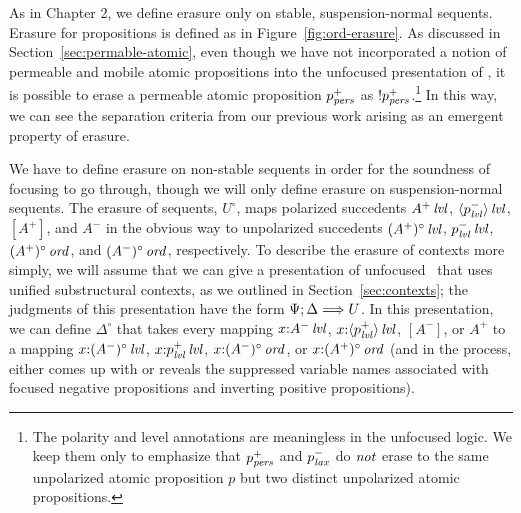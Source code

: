 As in Chapter 2, we define erasure only on stable, suspension-normal
sequents. Erasure for propositions is defined as in
Figure~\ref{fig:ord-erasure}. As discussed in
Section~\ref{sec:permable-atomic}, even though we have not
incorporated a notion of permeable and mobile atomic propositions into
the unfocused presentation of \ollll, it is possible to erase a
permeable atomic proposition $p^+_{\it pers}$ as
${!}p^+_{\it pers}$.\footnote{The polarity and level annotations are
  meaningless in the unfocused logic. We keep them only to emphasize
  that $p^+_{\it pers}$ and $p^-_{\it lax}$ do $\it not$ erase to the same
  unpolarized atomic proposition $p$ but two distinct unpolarized
  atomic propositions.}  In this way, we can see the separation
criteria from our previous work
\cite{simmons08linear,pfenning09substructural} arising as an emergent
property of erasure.

We have to define erasure on non-stable sequents in order for the
soundness of focusing to go through, though we will only define
erasure on suspension-normal sequents.  The erasure of sequents,
$U^\circ$, maps polarized succedents ${A^+}\,{{\it lvl}}$,
${\langle {p^-_{\it lvl}} \rangle}\,{{\it lvl}}$, $[A^+]$, and $A^-$ in the obvious way to
unpolarized succedents ${(A^+)^\circ}\,{{\it lvl}}$, ${p^-_{\it lvl}}\,{{\it lvl}}$,
${(A^+)^\circ}\,{{\it ord}}$, and ${(A^-)^\circ}\,{{\it ord}}$, respectively.  To
describe the erasure of contexts more simply, we will assume that we
can give a presentation of unfocused \ollll~that uses unified
substructural contexts, as we outlined in
Section~\ref{sec:contexts}; the judgments of this presentation
have the form $\Psi; \Delta \Longrightarrow U$. 
In this presentation, we can define $\Delta^\circ$ that
takes every mapping $x{:}{A^-}\,{{\it lvl}}$, $x{:}{\langle {p^+_{\it lvl}} \rangle}\,{{\it lvl}}$,
$[A^-]$, or $A^+$ to a mapping $x{:}{(A^-)^\circ}\,{{\it lvl}}$,
$x{:}{p^+_{\it lvl}}\,{{\it lvl}}$, $x{:}{(A^-)^\circ}\,{{\it ord}}$, or
$x{:}{(A^+)^\circ}\,{{\it ord}}$ (and in the process, either comes up with
or reveals the suppressed variable names associated with focused
negative propositions and inverting positive propositions).

